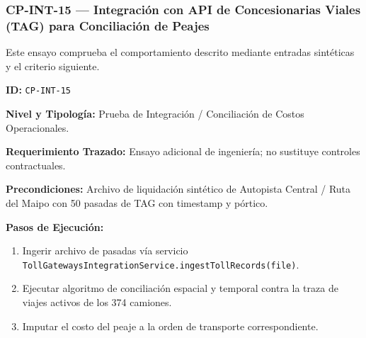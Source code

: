 \subsubsection*{CP-INT-15 — Integración con API de Concesionarias Viales (TAG) para Conciliación de Peajes}\label{sec:9-cp-int-15}
Este ensayo comprueba el comportamiento descrito mediante entradas sintéticas y el criterio siguiente.

\par\noindent\textbf{ID:} \texttt{C\allowbreak{}P\allowbreak{}-\allowbreak{}I\allowbreak{}N\allowbreak{}T\allowbreak{}-\allowbreak{}1\allowbreak{}5\allowbreak{}}\par
\par\noindent\textbf{Nivel y Tipología:} Prueba de Integración / Conciliación de Costos Operacionales.\par
\par\noindent\textbf{Requerimiento Trazado:} Ensayo adicional de ingeniería; no sustituye controles contractuales.\par
\par\noindent\textbf{Precondiciones:} Archivo de liquidación sintético de Autopista Central / Ruta del Maipo con 50 pasadas de TAG con timestamp y pórtico.\par
\par\noindent\textbf{Pasos de Ejecución:} \par
\begin{enumerate}
\item Ingerir archivo de pasadas vía servicio \texttt{T\allowbreak{}o\allowbreak{}l\allowbreak{}l\allowbreak{}G\allowbreak{}a\allowbreak{}t\allowbreak{}e\allowbreak{}w\allowbreak{}a\allowbreak{}y\allowbreak{}s\allowbreak{}I\allowbreak{}n\allowbreak{}t\allowbreak{}e\allowbreak{}g\allowbreak{}r\allowbreak{}a\allowbreak{}t\allowbreak{}i\allowbreak{}o\allowbreak{}n\allowbreak{}S\allowbreak{}e\allowbreak{}r\allowbreak{}v\allowbreak{}i\allowbreak{}c\allowbreak{}e\allowbreak{}.\allowbreak{}i\allowbreak{}n\allowbreak{}g\allowbreak{}e\allowbreak{}s\allowbreak{}t\allowbreak{}T\allowbreak{}o\allowbreak{}l\allowbreak{}l\allowbreak{}R\allowbreak{}e\allowbreak{}c\allowbreak{}o\allowbreak{}r\allowbreak{}d\allowbreak{}s\allowbreak{}(\allowbreak{}f\allowbreak{}i\allowbreak{}l\allowbreak{}e\allowbreak{})\allowbreak{}}.
\item Ejecutar algoritmo de conciliación espacial y temporal contra la traza de viajes activos de los 374 camiones.
\item Imputar el costo del peaje a la orden de transporte correspondiente.
\end{enumerate}
